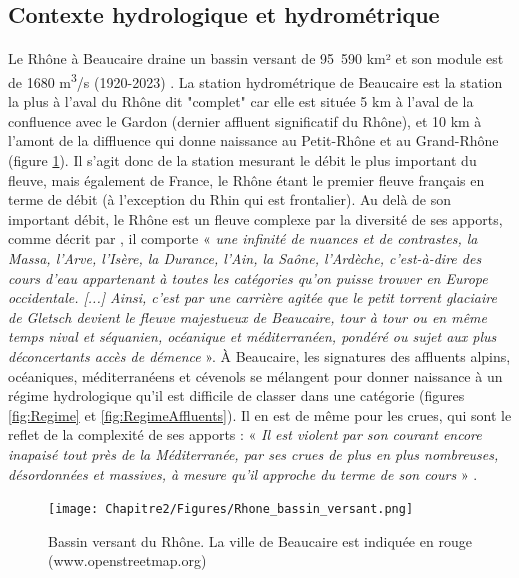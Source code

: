 \FloatBarrier
	\subsection{Contexte hydrologique et hydrométrique}
	
	\paragraph{} Le Rhône à Beaucaire draine un bassin versant de 95~590 km² et son module est de 1680 m\textsuperscript{3}/s (1920-2023) \citep{medd_banque_2021}. La station hydrométrique de Beaucaire est la station la plus à l'aval du Rhône dit "complet" car elle est située 5 km à l'aval de la confluence avec le Gardon (dernier affluent significatif du Rhône), et 10 km à l'amont de la diffluence qui donne naissance au Petit-Rhône et au Grand-Rhône (figure \ref{fig:BV}). Il s'agit donc de la station mesurant le débit le plus important du fleuve, mais également de France, le Rhône étant le premier fleuve français en terme de débit (à l'exception du Rhin qui est frontalier). Au delà de son important débit, le Rhône est un fleuve complexe par la diversité de ses apports, comme décrit par \citet{parde_regime_1925}, il comporte « \textit{ une infinité de nuances et de contrastes, la Massa, l'Arve, l'Isère, la Durance, l'Ain, la Saône, l'Ardèche, c'est-à-dire des cours d'eau appartenant à toutes les catégories qu'on puisse trouver en Europe occidentale. [...] Ainsi, c'est par une carrière agitée que le petit torrent glaciaire de Gletsch devient le fleuve majestueux de Beaucaire, tour à tour ou en même temps nival et séquanien, océanique et méditerranéen, pondéré ou sujet aux plus déconcertants accès de démence} ». À Beaucaire, les signatures des affluents alpins, océaniques, méditerranéens et cévenols se mélangent pour donner naissance à un régime hydrologique qu'il est difficile de classer dans une catégorie (figures \ref{fig:Regime} et \ref{fig:RegimeAffluents}). Il en est de même pour les crues, qui sont le reflet de la complexité de ses apports : « \textit{Il est violent par son courant encore inapaisé tout près de la Méditerranée, par ses crues de plus en plus nombreuses, désordonnées et massives, à mesure qu'il approche du terme de son cours} » \citep{parde_regime_1925}. 
	
		\begin{figure}[h!]
	\centering
		\texttt{[image: Chapitre2/Figures/Rhone\_bassin\_versant.png]}
        \caption{Bassin versant du Rhône. La ville de Beaucaire est indiquée en rouge (www.openstreetmap.org)}	
		\label{fig:BV}
	\end{figure}
	
